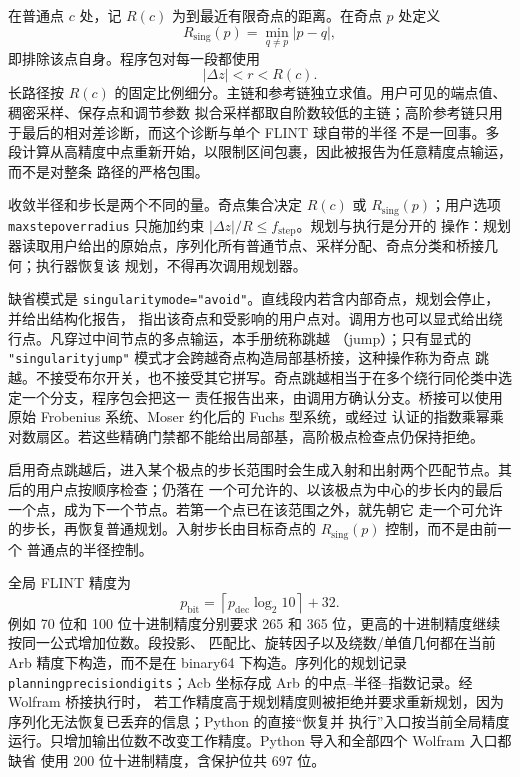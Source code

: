 \documentclass[11pt,a4paper]{ctexart}
\renewcommand{\_}{\origunderscore\allowbreak}
\begin{document}
在普通点 $c$ 处，记 $R(c)$ 为到最近有限奇点的距离。在奇点 $p$ 处定义
\begin{equation}
 R_{\mathrm{sing}}(p)=\min_{q\ne p}|p-q|,
\end{equation}
即排除该点自身。程序包对每一段都使用
\begin{equation}
  |\Delta z|<r< R(c).
\end{equation}
长路径按 $R(c)$ 的固定比例细分。主链和参考链独立求值。用户可见的端点值、稠密采样、保存点和调节参数
拟合采样都取自阶数较低的主链；高阶参考链只用于最后的相对差诊断，而这个诊断与单个 FLINT 球自带的半径
不是一回事。多段计算从高精度中点重新开始，以限制区间包裹，因此被报告为任意精度点输运，而不是对整条
路径的严格包围。

收敛半径和步长是两个不同的量。奇点集合决定 $R(c)$ 或 $R_{\mathrm{sing}}(p)$；用户选项
\texttt{max\_step\_over\_radius} 只施加约束 $|\Delta z|/R\leq f_{\mathrm{step}}$。规划与执行是分开的
操作：规划器读取用户给出的原始点，序列化所有普通节点、采样分配、奇点分类和桥接几何；执行器恢复该
规划，不得再次调用规划器。

缺省模式是 \texttt{singularity\_mode="avoid"}。直线段内若含内部奇点，规划会停止，并给出结构化报告，
指出该奇点和受影响的用户点对。调用方也可以显式给出绕行点。凡穿过中间节点的多点输运，本手册统称跳越
（jump）；只有显式的 \texttt{"singularity\_jump"} 模式才会跨越奇点构造局部基桥接，这种操作称为奇点
跳越。不接受布尔开关，也不接受其它拼写。奇点跳越相当于在多个绕行同伦类中选定一个分支，程序包会把这一
责任报告出来，由调用方确认分支。桥接可以使用原始 Frobenius 系统、Moser 约化后的 Fuchs 型系统，或经过
认证的指数乘幂乘对数扇区。若这些精确门禁都不能给出局部基，高阶极点检查点仍保持拒绝。

启用奇点跳越后，进入某个极点的步长范围时会生成入射和出射两个匹配节点。其后的用户点按顺序检查；仍落在
一个可允许的、以该极点为中心的步长内的最后一个点，成为下一个节点。若第一个点已在该范围之外，就先朝它
走一个可允许的步长，再恢复普通规划。入射步长由目标奇点的 $R_{\mathrm{sing}}(p)$ 控制，而不是由前一个
普通点的半径控制。

全局 FLINT 精度为
\begin{equation}
 p_{\mathrm{bit}}=\left\lceil p_{\mathrm{dec}}\log_2 10\right\rceil+32.
\end{equation}
例如 70 位和 100 位十进制精度分别要求 265 和 365 位，更高的十进制精度继续按同一公式增加位数。段投影、
匹配比、旋转因子以及绕数/单值几何都在当前 Arb 精度下构造，而不是在 binary64 下构造。序列化的规划记录
\texttt{planning\_precision\_digits}；Acb 坐标存成 Arb 的中点--半径--指数记录。经 Wolfram 桥接执行时，
若工作精度高于规划精度则被拒绝并要求重新规划，因为序列化无法恢复已丢弃的信息；Python 的直接“恢复并
执行”入口按当前全局精度运行。只增加输出位数不改变工作精度。Python 导入和全部四个 Wolfram 入口都缺省
使用 200 位十进制精度，含保护位共 697 位。
\end{document}
